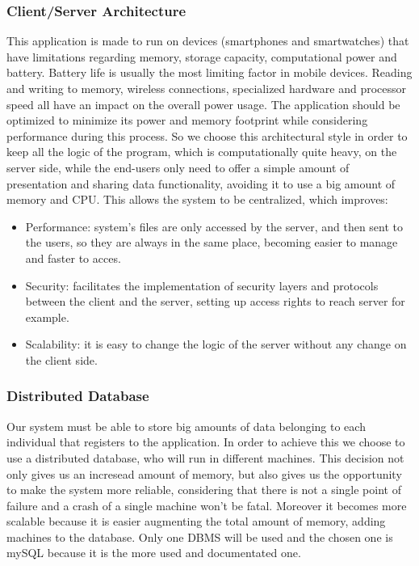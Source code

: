 \documentclass[12pt]{article}
\begin{document}
\subsubsection{Client/Server Architecture} 
This application is made to run on devices (smartphones and smartwatches) that have limitations regarding memory, storage capacity, computational power and battery. Battery life is usually the most limiting factor in mobile devices. Reading and writing to memory, wireless connections, specialized hardware and processor speed all have an impact on the overall power usage. The application should be optimized to minimize its power and memory footprint while considering performance during this process. So we choose this architectural style in order to keep all the logic of the program, which is computationally quite heavy, on the server side, while the end-users only need to offer a simple amount of presentation and sharing data functionality, avoiding it to use a big amount of memory and CPU. This allows the system to be centralized, which improves: 
\begin{itemize}
    \item Performance: system's files are only accessed by the server, and then sent to the users, so they are always in the same place, becoming easier to manage and faster to acces.
    \item Security: facilitates the implementation of security layers and protocols between the client and the server, setting up access rights to reach server for example. 
    \item Scalability: it is easy to change the logic of the server without any change on the client side.  
\end{itemize}

\subsubsection{Distributed Database} Our system must be able to store big amounts of data belonging to each individual that registers to the application. In order to achieve this we choose to use a distributed database, who will run in different machines. This decision not only gives us an incresead amount of memory, but also gives us the opportunity to make the system more reliable, considering that there is not a single point of failure and a crash of a single machine won't be fatal. Moreover it becomes more scalable because it is easier augmenting the total amount of memory, adding machines to the database. Only one DBMS will be used and the chosen one is mySQL because it is the more used and documentated one. 
\end{document}
